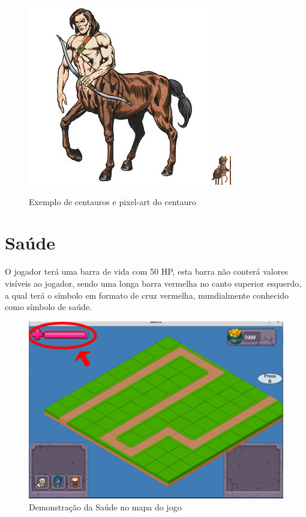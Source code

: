 \documentclass[11pt]{article} %
\begin{document}
\begin{figure}[!htp]
\centering
\includegraphics[scale=0.4]{res/characters/centauro.jpg} \quad
\includegraphics[scale=3]{res/characters/centauro.png} 
\caption{Exemplo de centauros e pixel-art do centauro}
\label{cyclops}
\end{figure}

\newpage

\section{Saúde}

O jogador terá uma barra de vida com 50 HP, esta barra não conterá valores visíveis ao jogador, sendo uma longa barra vermelha no canto superior esquerdo, a qual terá o símbolo em formato de cruz vermelha, mundialmente conhecido como símbolo de saúde.

\begin{figure}[!htp]
\centering
\includegraphics[scale=0.3]{res/saude.png}
\caption{Demonstração da Saúde no mapa do jogo}
\label{Saúde}
\end{figure}
 
\end{document}
